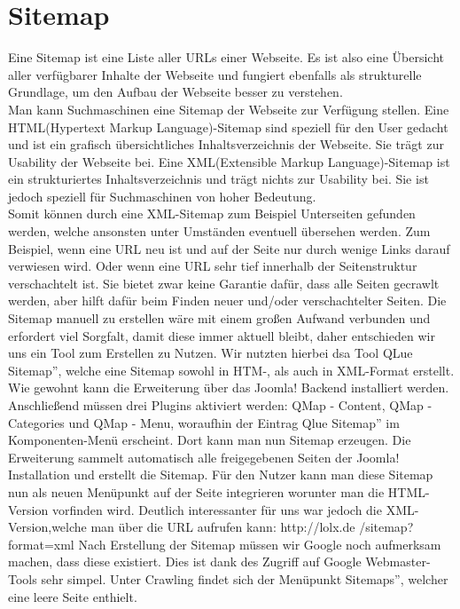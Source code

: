 \chapter{Sitemap}
Eine Sitemap ist eine Liste aller URLs einer Webseite. Es ist also eine Übersicht aller verfügbarer Inhalte der Webseite und fungiert ebenfalls als strukturelle Grundlage, um den Aufbau der Webseite besser zu verstehen.\\
Man kann Suchmaschinen eine Sitemap der Webseite zur Verfügung stellen. 
Eine HTML(Hypertext Markup Language)-Sitemap sind speziell für den User gedacht und ist ein grafisch übersichtliches Inhaltsverzeichnis der Webseite. Sie trägt zur Usability der Webseite bei.
Eine XML(Extensible Markup Language)-Sitemap ist ein strukturiertes Inhaltsverzeichnis und trägt nichts zur Usability bei. Sie ist jedoch speziell für Suchmaschinen von hoher Bedeutung.\\
Somit können durch eine XML-Sitemap zum Beispiel Unterseiten gefunden werden, welche ansonsten unter Umständen eventuell übersehen werden. Zum Beispiel, wenn eine URL neu ist und auf der Seite nur durch wenige Links darauf verwiesen wird.  Oder wenn eine URL sehr tief innerhalb der Seitenstruktur verschachtelt ist. 
Sie bietet zwar keine Garantie dafür, dass alle Seiten gecrawlt werden, aber hilft dafür beim Finden neuer und/oder verschachtelter Seiten.
Die Sitemap manuell zu erstellen wäre mit einem großen Aufwand verbunden und erfordert viel Sorgfalt, damit diese immer aktuell bleibt, daher entschieden wir uns ein Tool zum Erstellen zu Nutzen. Wir nutzten hierbei dsa Tool \glqq QLue Sitemap”, welche eine Sitemap sowohl in HTM-, als auch in XML-Format erstellt.
Wie gewohnt kann die Erweiterung über das Joomla! Backend installiert werden. Anschließend müssen drei Plugins aktiviert werden: QMap - Content, QMap - Categories und QMap - Menu, woraufhin der Eintrag \glqq Qlue Sitemap” im Komponenten-Menü erscheint. Dort kann man nun Sitemap erzeugen. Die Erweiterung sammelt automatisch alle freigegebenen Seiten der Joomla! Installation und erstellt die Sitemap.
Für den Nutzer kann man diese Sitemap nun als neuen Menüpunkt auf der Seite integrieren worunter man die HTML-Version vorfinden wird. Deutlich interessanter für uns war jedoch die XML-Version,welche man über die URL aufrufen kann:
http://lolx.de /sitemap?format=xml
Nach Erstellung der Sitemap müssen wir Google noch aufmerksam machen, dass diese existiert. Dies ist dank des Zugriff auf Google Webmaster-Tools sehr simpel. 
Unter Crawling findet sich der Menüpunkt \glqq Sitemaps”, welcher eine leere Seite enthielt.
